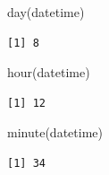 \documentclass[
  letterpaper,
  DIV=11,
  numbers=noendperiod]{scrartcl}
\newenvironment{Shaded}{\begin{snugshade}}{\end{snugshade}}
\newcommand{\FunctionTok}[1]{\textcolor[rgb]{0.28,0.35,0.67}{#1}}
\newcommand{\NormalTok}[1]{\textcolor[rgb]{0.00,0.23,0.31}{#1}}
\begin{document}
\begin{Shaded}
\begin{Highlighting}[]
\FunctionTok{day}\NormalTok{(datetime)}
\end{Highlighting}
\end{Shaded}

\begin{verbatim}
[1] 8
\end{verbatim}

\begin{Shaded}
\begin{Highlighting}[]
\FunctionTok{hour}\NormalTok{(datetime)}
\end{Highlighting}
\end{Shaded}

\begin{verbatim}
[1] 12
\end{verbatim}

\begin{Shaded}
\begin{Highlighting}[]
\FunctionTok{minute}\NormalTok{(datetime)}
\end{Highlighting}
\end{Shaded}

\begin{verbatim}
[1] 34
\end{verbatim}
\end{document}

